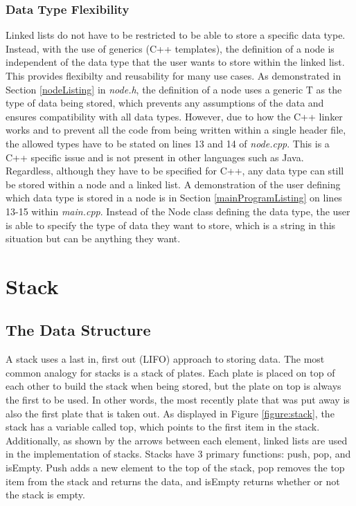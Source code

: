 \documentclass[letterpaper, 10pt,DIV=13]{scrartcl}
\numberwithin{equation}{section} %
\numberwithin{figure}{section} %
\numberwithin{table}{section} %
\begin{document}
\subsubsection{Data Type Flexibility}\label{linkedListDataType}
Linked lists do not have to be restricted to be able to store a specific data type. Instead, with the use of generics (C++ templates), the definition of a node is
independent of the data type that the user wants to store within the linked list. This provides flexibilty and reusability for many use cases. As demonstrated in
Section \ref{nodeListing} in \textit{node.h}, the definition of a node uses a generic T as the type of data being stored, which prevents any assumptions of the data
and ensures compatibility with all data types. However, due to how the C++ linker works and to prevent all the code from being written within a single header file,
the allowed types have to be stated on lines 13 and 14 of \textit{node.cpp}. This is a C++ specific issue and is not present in other languages such as Java.
Regardless, although they have to be specified for C++, any data type can still be stored within a node and a linked list. A demonstration of the user defining
which data type is stored in a node is in Section \ref{mainProgramListing} on lines 13-15 within \textit{main.cpp}. Instead of the Node class defining the data type,
the user is able to specify the type of data they want to store, which is a string in this situation but can be anything they want.

\section{Stack}
\subsection{The Data Structure}\label{stackDataStructure}
A stack uses a last in, first out (LIFO) approach to storing data. The most common analogy for stacks is a stack of plates. Each plate is
placed on top of each other to build the stack when being stored, but the plate on top is always the first to be used. In other words, the most recently plate
that was put away is also the first plate that is taken out. As displayed in Figure \ref{figure:stack}, the stack has a variable called top, which points to the first item in the stack.
Additionally, as shown by the arrows between each element, linked lists are used in the implementation of stacks. Stacks have 3 primary functions: push, pop, and isEmpty.
Push adds a new element to the top of the stack, pop removes the top item from the stack and returns the data, and isEmpty returns whether or not the stack is empty.
\end{document}
